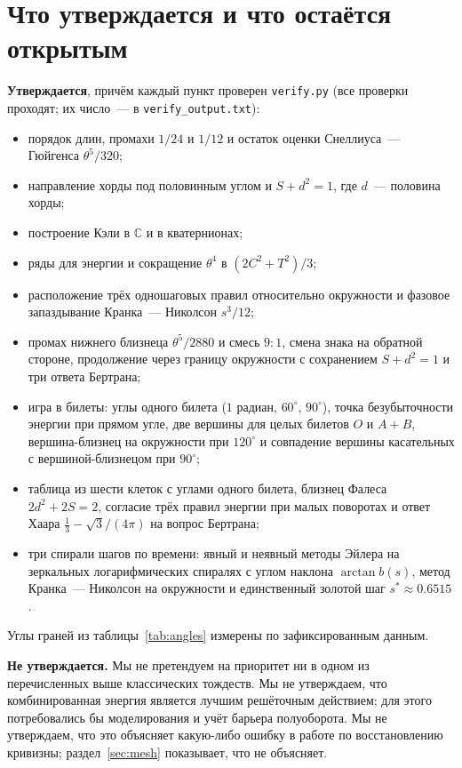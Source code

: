 \section{Что утверждается и что остаётся открытым}\label{sec:claims}

\textbf{Утверждается}, причём каждый пункт проверен \texttt{verify.py} (все проверки проходят; их число~--- в \texttt{verify\_output.txt}):
\begin{itemize}
  \item порядок длин, промахи $1/24$ и $1/12$ и остаток оценки Снеллиуса~--- Гюйгенса $\theta^5/320$;
  \item направление хорды под половинным углом и $S+d^2=1$, где $d$~--- половина хорды;
  \item построение Кэли в $\mathbb{C}$ и в кватернионах;
  \item ряды для энергии и сокращение $\theta^4$ в $(2C^2+T^2)/3$;
  \item расположение трёх одношаговых правил относительно окружности и фазовое запаздывание Кранка~--- Николсон $s^3/12$;
  \item промах нижнего близнеца $\theta^5/2880$ и смесь $9{:}1$, смена знака на обратной стороне,
    продолжение через границу окружности с сохранением $S+d^2=1$ и три ответа Бертрана;
  \item игра в билеты: углы одного билета ($1$ радиан, $60^\circ$, $90^\circ$),
    точка безубыточности энергии при прямом угле, две вершины для целых билетов $O$ и $A+B$,
    вершина-близнец на окружности при $120^\circ$ и совпадение вершины касательных с вершиной-близнецом при $90^\circ$;
  \item таблица из шести клеток с углами одного билета, близнец Фалеса $2d^2+2S=2$, согласие
    трёх правил энергии при малых поворотах и ответ Хаара $\tfrac13-\sqrt3/(4\pi)$ на вопрос Бертрана;
  \item три спирали шагов по времени: явный и неявный методы Эйлера на зеркальных логарифмических спиралях
    с углом наклона $\arctan b(s)$, метод Кранка~--- Николсон на окружности и единственный золотой шаг $s^\ast\approx0.6515$.
\end{itemize}
Углы граней из таблицы~\ref{tab:angles} измерены по зафиксированным данным.

\textbf{Не утверждается.} Мы не претендуем на приоритет ни в одном из перечисленных выше классических тождеств. Мы не утверждаем, что
комбинированная энергия является лучшим решёточным действием; для этого потребовались бы моделирования и
учёт барьера полуоборота. Мы не утверждаем, что это объясняет какую-либо ошибку в
работе по восстановлению кривизны; раздел~\ref{sec:mesh} показывает, что не объясняет.

